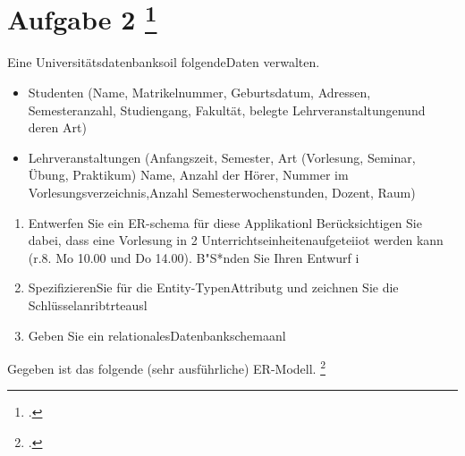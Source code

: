 \documentclass{lehramt-informatik-minimal}
\begin{document}
\section{Aufgabe 2
\footcite[Aufgabe 2]{examen:66111:1996:03}}

Eine Universitätsdatenbanksoil folgendeDaten verwalten.

\begin{itemize}
\item Studenten (Name, Matrikelnummer, Geburtsdatum, Adressen,
Semesteranzahl, Studiengang, Fakultät, belegte Lehrveranstaltungenund
deren Art)

\item Lehrveranstaltungen (Anfangszeit, Semester, Art (Vorlesung,
Seminar, Übung, Praktikum) Name, Anzahl der Hörer, Nummer im
Vorlesungsverzeichnis,Anzahl Semesterwochenstunden, Dozent, Raum)
\end{itemize}

\begin{enumerate}
\item Entwerfen Sie ein ER-schema für diese Applikationl
Berücksichtigen Sie dabei, dass eine Vorlesung in 2
Unterrichtseinheitenaufgeteiiot werden kann (r.8. Mo 10.00 und Do
14.00). B"S*nden Sie Ihren Entwurf i

\item SpezifizierenSie für die Entity-TypenAttributg und zeichnen Sie
die Schlüsselanribtrteausl

\item Geben Sie ein relationalesDatenbankschemaanl
\end{enumerate}

Gegeben ist das folgende (sehr ausführliche) ER-Modell.
\footcite[Aufgabe 2: Uni-ER-Modell]{db:ab:4}
\end{document}
